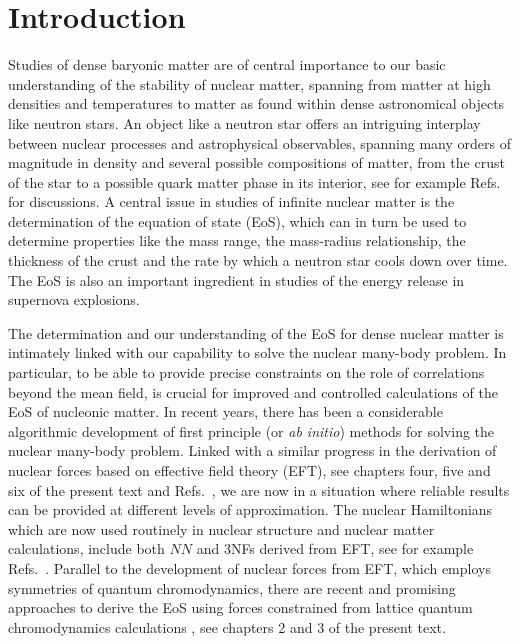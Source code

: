 
\section{Introduction}


Studies of dense baryonic matter are of central importance to our
basic understanding of the stability of nuclear matter, spanning from
matter at high densities and temperatures to matter as found within
dense astronomical objects like neutron stars.
An object like a neutron star offers an intriguing interplay between
nuclear processes and astrophysical observables, spanning many orders
of magnitude in density and several possible compositions of matter,
from the crust of the star to a possible quark matter phase in its
interior, see for example
Refs.~\cite{lattimer2007,lattimer2012,hebeler2012f,weber1999,hh2000}
for discussions.  A central issue in studies of infinite nuclear
matter is the determination of the equation of state (EoS), which can
in turn be used to determine properties like the mass range, the
mass-radius relationship, the thickness of the crust and the rate by
which a neutron star cools down over time. The EoS is also an
important ingredient in studies of the energy release in supernova
explosions.

The determination and our understanding of the EoS for dense nuclear
matter is intimately linked with our capability to solve the nuclear
many-body problem. In particular, to be able to provide precise
constraints on the role of correlations beyond the mean field, is
crucial for improved and controlled calculations of the EoS of
nucleonic matter.  In recent years, there has been a considerable
algorithmic development of first principle (or {\em ab initio})
methods for solving the nuclear many-body problem. Linked with a
similar progress in the derivation of nuclear forces based on
effective field theory (EFT), see chapters four, five and six  of the present text and Refs.~\cite{vankolck1994,machleidt2011,epelbaum2009}, 
we are now in a
situation where reliable results can be provided at different levels
of approximation.  The nuclear Hamiltonians which are now used
routinely in nuclear structure and nuclear matter calculations,
include both $NN$ and 3NFs derived from EFT, see for example
Refs.~\cite{hammer2013,binder2013,hergert2013,roth2012,hagen2012a,hagen2012b,cipollone2013,hebeler2010b,krueger2013,carbone2013}.
Parallel to the development of nuclear forces from EFT, which employs
symmetries of quantum chromodynamics, there are recent and promising
approaches to derive the EoS using forces constrained from lattice
quantum chromodynamics calculations \cite{tetsuo2013}, see chapters 2 and 3 of the present text.

